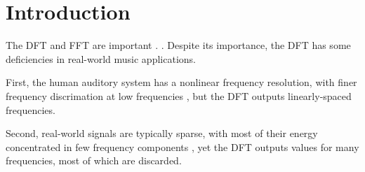 \documentclass[letter,12pt,notitlepage]{article}
\title{\ThesisTitle}
\author{\vspace{1em}\\Sevag Hanssian \\
  McGill University \\
 \small{\texttt{sevag.hanssian@mail.mcgill.ca}} \\
 \small{\texttt{sevagh@protonmail.com}} \\\ \\\ \\
 \small{Thesis for Master of Arts in Music Technology}\\
 \small{Date TBD, 2021}}
\date{}
\begin{document}
\maketitle

\vspace{3.5em}

\begin{abstract}
	The short-time Fourier transform (STFT) is an important tool for the time-frequency analysis of acoustic signals. The STFT is commonly used as the input representation of music signals in deep learning models. Two tasks where such models have recently achieved success are audio beat tracking and music source separation. The Constant-Q Transform (CQT) and the warped STFT are alternative time-frequency representations that may be more suitable for music than the STFT. In this thesis, first the STFT, CQT, and warped STFT are described as tools for representing and manipulating music signals. Next, the STFT is replaced with the CQT and warped STFT in two modern deep learning models for the audio beat tracking and music source separation tasks respectively, showing significant improvements in the results.
\end{abstract}

\vfill
\clearpage %

\tableofcontents

\vfill
\clearpage %

\listoffigures

\listoflistings

\vfill
\clearpage %

\section{Introduction}
\label{sec:intro}


The DFT and FFT \cite{cooleytukey} are important \cite{dftimportant}. . Despite its importance, the DFT has some deficiencies in real-world music applications.

First, the human auditory system has a nonlinear frequency resolution, with finer frequency discrimation at low frequencies , but the DFT outputs linearly-spaced frequencies.

Second, real-world signals are typically sparse, with most of their energy concentrated in few frequency components \cite{sparseintro}, yet the DFT outputs values for many frequencies, most of which are discarded.
\end{document}
